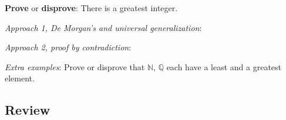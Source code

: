 \documentclass[12pt, oneside]{article}
\begin{document}
\vspace{100pt}

{\bf Prove} or {\bf  disprove}: There is a greatest integer. 

{\it Approach 1, De Morgan's and universal generalization}: 

\vspace{100pt}

{\it Approach 2, proof by contradiction}: 

\vspace{200pt}

{\it Extra examples}: 
Prove or disprove that $\mathbb{N}$,  $\mathbb{Q}$ each have a
least and a greatest element. 
 
\newpage
\subsection*{Review}
\end{document}
